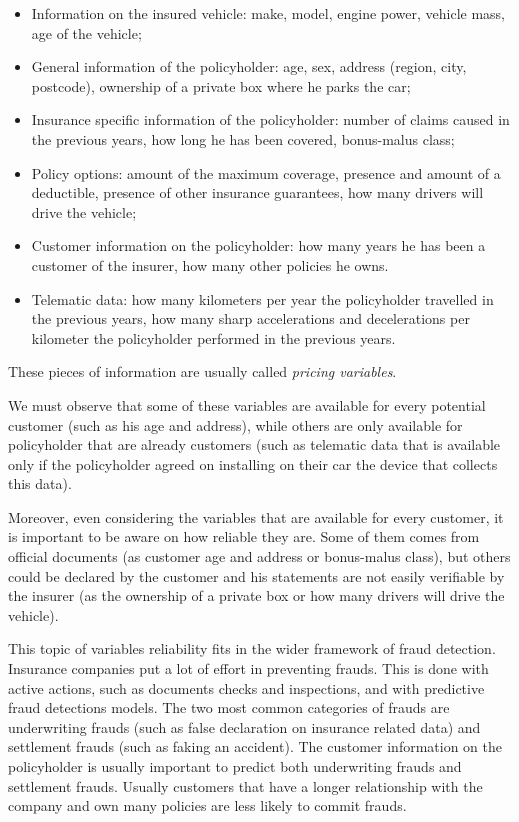 \documentclass[a4paper, nobind]{templates/ociamthesis}
\providecommand{\tightlist}{%
  \setlength{\itemsep}{0pt}\setlength{\parskip}{0pt}}
\theoremstyle{definition}
\theoremstyle{definition}
\theoremstyle{definition}
\theoremstyle{remark}
\begin{document}
\begin{itemize}
\tightlist
\item
  Information on the insured vehicle: make, model, engine power, vehicle mass, age of the vehicle;
\item
  General information of the policyholder: age, sex, address (region, city, postcode), ownership of a private box where he parks the car;
\item
  Insurance specific information of the policyholder: number of claims caused in the previous years, how long he has been covered, bonus-malus class;
\item
  Policy options: amount of the maximum coverage, presence and amount of a deductible, presence of other insurance guarantees, how many drivers will drive the vehicle;
\item
  Customer information on the policyholder: how many years he has been a customer of the insurer, how many other policies he owns.
\item
  Telematic data: how many kilometers per year the policyholder travelled in the previous years, how many sharp accelerations and decelerations per kilometer the policyholder performed in the previous years.
\end{itemize}

These pieces of information are usually called \emph{pricing variables}.

We must observe that some of these variables are available for every potential customer (such as his age and address), while others are only available for policyholder that are already customers (such as telematic data that is available only if the policyholder agreed on installing on their car the device that collects this data).

Moreover, even considering the variables that are available for every customer, it is important to be aware on how reliable they are. Some of them comes from official documents (as customer age and address or bonus-malus class), but others could be declared by the customer and his statements are not easily verifiable by the insurer (as the ownership of a private box or how many drivers will drive the vehicle).

This topic of variables reliability fits in the wider framework of fraud detection. Insurance companies put a lot of effort in preventing frauds. This is done with active actions, such as documents checks and inspections, and with predictive fraud detections models. The two most common categories of frauds are underwriting frauds (such as false declaration on insurance related data) and settlement frauds (such as faking an accident). The customer information on the policyholder is usually important to predict both underwriting frauds and settlement frauds. Usually customers that have a longer relationship with the company and own many policies are less likely to commit frauds.
\end{document}
